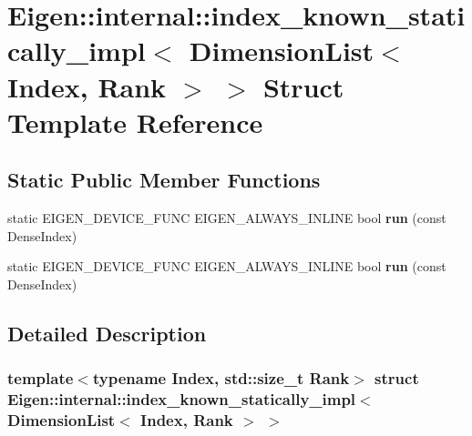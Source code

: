 \hypertarget{struct_eigen_1_1internal_1_1index__known__statically__impl_3_01_dimension_list_3_01_index_00_01_rank_01_4_01_4}{}\section{Eigen\+:\+:internal\+:\+:index\+\_\+known\+\_\+statically\+\_\+impl$<$ Dimension\+List$<$ Index, Rank $>$ $>$ Struct Template Reference}
\label{struct_eigen_1_1internal_1_1index__known__statically__impl_3_01_dimension_list_3_01_index_00_01_rank_01_4_01_4}
\subsection*{Static Public Member Functions}
\begin{DoxyCompactItemize}
\item 
\mbox{\label{struct_eigen_1_1internal_1_1index__known__statically__impl_3_01_dimension_list_3_01_index_00_01_rank_01_4_01_4_a85a838562e3b99f5c28f6d8b0b94824e}} 
static E\+I\+G\+E\+N\+\_\+\+D\+E\+V\+I\+C\+E\+\_\+\+F\+U\+NC E\+I\+G\+E\+N\+\_\+\+A\+L\+W\+A\+Y\+S\+\_\+\+I\+N\+L\+I\+NE bool {\bfseries run} (const Dense\+Index)
\item 
\mbox{\label{struct_eigen_1_1internal_1_1index__known__statically__impl_3_01_dimension_list_3_01_index_00_01_rank_01_4_01_4_a85a838562e3b99f5c28f6d8b0b94824e}} 
static E\+I\+G\+E\+N\+\_\+\+D\+E\+V\+I\+C\+E\+\_\+\+F\+U\+NC E\+I\+G\+E\+N\+\_\+\+A\+L\+W\+A\+Y\+S\+\_\+\+I\+N\+L\+I\+NE bool {\bfseries run} (const Dense\+Index)
\end{DoxyCompactItemize}


\subsection{Detailed Description}
\subsubsection*{template$<$typename Index, std\+::size\+\_\+t Rank$>$\newline
struct Eigen\+::internal\+::index\+\_\+known\+\_\+statically\+\_\+impl$<$ Dimension\+List$<$ Index, Rank $>$ $>$}



